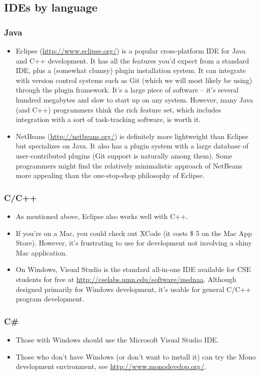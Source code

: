 \documentclass[12pt]{article}
\begin{document}
\subsection{IDEs by language}

\subsubsection{Java}
\begin{itemize}
    \item Eclipse (\url{http://www.eclipse.org/}) is a popular cross-platform IDE for Java and C++ development. It has all the features you'd expect from a standard IDE, plus a (somewhat clumsy) plugin installation system. It can integrate with version control systems such as Git (which we will most likely be using) through the plugin framework. It's a large piece of software -- it's several hundred megabytes and slow to start up on any system. However, many Java (and C++) programmers think the rich feature set, which includes integration with a sort of task-tracking software, is worth it. 
    \item NetBeans (\url{http://netbeans.org/}) is definitely more lightweight than Eclipse but specializes on Java. It also has a plugin system with a large database of user-contributed plugins (Git support is naturally among them). Some programmers might find the relatively minimalistic approach of NetBeans more appealing than the one-stop-shop philosophy of Eclipse.
\end{itemize}
\subsubsection{C/C++}
\begin{itemize}
    \item As mentioned above, Eclipse also works well with C++. 
    \item If you're on a Mac, you could check out XCode (it costs \$ 5 on the Mac App Store). However, it's frustrating to use for development not involving a shiny Mac application. 
    \item On Windows, Visual Studio is the standard all-in-one IDE available for CSE students for free at \url{http://cselabs.umn.edu/software/msdnaa}. Although designed primarily for Windows development, it's usable for general C/C++ program development.
\end{itemize}
\subsubsection{C\#}
\begin{itemize}
    \item Those with Windows should use the Microsoft Visual Studio IDE. 
    \item Those who don't have Windows (or don't want to install it) can try the Mono development environment, see \url{http://www.monodevelop.org/}. 
\end{itemize}
\end{document}
